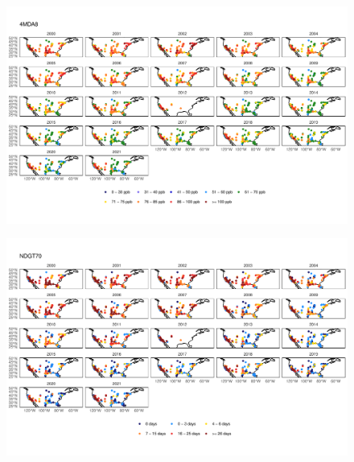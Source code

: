 \documentclass{article}
\begin{document}

\begin{figure}
\centering
\includegraphics[height=0.75\textheight]{figures/si_figures/fS15_metric_map_United-States-of-America_4MDA8.pdf}
\caption{}
\label{si_fig:metric_map_us_4MDA8}
\end{figure}
\clearpage

\begin{figure}
\centering
\includegraphics[height=0.75\textheight]{figures/si_figures/fS16_metric_map_United-States-of-America_NDGT70.pdf}
\caption{}
\label{si_fig:metric_map_us_NDGT70}
\end{figure}
\clearpage
\end{document}
